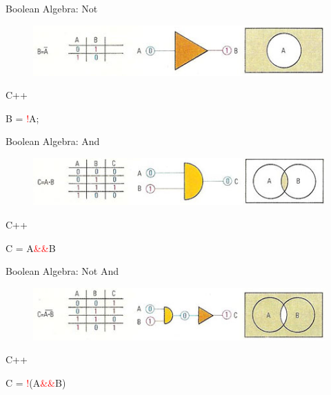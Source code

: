 \documentclass[xcolor={dvipsnames}]{beamer}
\begin{document}
\begin{frame}{Boolean Algebra: Not}
	\begin{figure}
		\href{http://www.daviddarling.info/encyclopedia/B/Boolean_algebra.html}{\includegraphics[width=1\textwidth]{not}}
	\end{figure}
	\pause
	\begin{block}{C++}
		\begin{center}
			{\LARGE B = \textcolor{red}{!}A;}
		\end{center}
	\end{block}
\end{frame}

\begin{frame}{Boolean Algebra: And}
	\begin{figure}
		\href{http://www.daviddarling.info/encyclopedia/B/Boolean_algebra.html}{\includegraphics[width=1\textwidth]{and}}
	\end{figure}
	\pause
	\begin{block}{C++}
		\begin{center}
			{\LARGE C = A\textcolor{red}{\&\&}B}
		\end{center}
	\end{block}
\end{frame}

\begin{frame}{Boolean Algebra: Not And}
\begin{figure}
		\href{http://www.daviddarling.info/encyclopedia/B/Boolean_algebra.html}{\includegraphics[width=1\textwidth]{not_and}}
	\end{figure}
	\pause
	\begin{block}{C++}
		\begin{center}
			{\LARGE C = \textcolor{red}{!}(A\textcolor{red}{\&\&}B) }
		\end{center}
	\end{block}

\end{frame}
\end{document}
